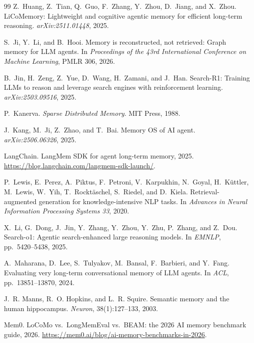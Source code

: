 \documentclass{article}
\theoremstyle{definition}\newtheorem{remark}{Remark}
\theoremstyle{plain}\newtheorem{proposition}{Proposition}
\begin{document}
\begin{thebibliography}{99}
 Z.~Huang, Z.~Tian, Q.~Guo,
F.~Zhang, Y.~Zhou, D.~Jiang, and X.~Zhou. LiCoMemory: Lightweight and
cognitive agentic memory for efficient long-term reasoning.
\emph{arXiv:2511.01448}, 2025.

 S.~Ji, Y.~Li, and B.~Hooi. Memory is
reconstructed, not retrieved: Graph memory for LLM agents. In
\emph{Proceedings of the 43rd International Conference on Machine Learning},
PMLR 306, 2026.

 B.~Jin, H.~Zeng, Z.~Yue, D.~Wang,
H.~Zamani, and J.~Han. Search-R1: Training LLMs to reason and leverage search
engines with reinforcement learning. \emph{arXiv:2503.09516}, 2025.

 P.~Kanerva. \emph{Sparse Distributed
Memory}. MIT Press, 1988.

 J.~Kang, M.~Ji, Z.~Zhao, and
T.~Bai. Memory OS of AI agent. \emph{arXiv:2506.06326}, 2025.

 LangChain. LangMem SDK for agent
long-term memory, 2025. \url{https://blog.langchain.com/langmem-sdk-launch/}.

 P.~Lewis, E.~Perez, A.~Piktus,
F.~Petroni, V.~Karpukhin, N.~Goyal, H.~K\"uttler, M.~Lewis, W.~Yih,
T.~Rockt\"aschel, S.~Riedel, and D.~Kiela. Retrieval-augmented generation for
knowledge-intensive NLP tasks. In \emph{Advances in Neural Information
Processing Systems 33}, 2020.

 X.~Li, G.~Dong, J.~Jin, Y.~Zhang,
Y.~Zhou, Y.~Zhu, P.~Zhang, and Z.~Dou. Search-o1: Agentic search-enhanced
large reasoning models. In \emph{EMNLP}, pp.\ 5420--5438, 2025.

 A.~Maharana, D.~Lee,
S.~Tulyakov, M.~Bansal, F.~Barbieri, and Y.~Fang. Evaluating very long-term
conversational memory of LLM agents. In \emph{ACL}, pp.\ 13851--13870, 2024.

 J.~R. Manns, R.~O. Hopkins, and
L.~R. Squire. Semantic memory and the human hippocampus. \emph{Neuron},
38(1):127--133, 2003.

 Mem0. LoCoMo vs.\ LongMemEval vs.\ BEAM:
the 2026 AI memory benchmark guide, 2026.
\url{https://mem0.ai/blog/ai-memory-benchmarks-in-2026}.


\end{thebibliography}
\end{document}
